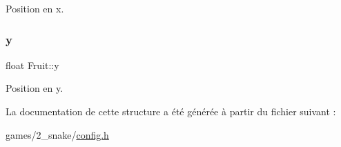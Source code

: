 Position en x. 

\mbox{\label{struct_fruit_a3a451bf39acece88739440190b1ccd98}} 
\subsubsection{\texorpdfstring{y}{y}}
{\footnotesize\ttfamily float Fruit\+::y}



Position en y. 



La documentation de cette structure a été générée à partir du fichier suivant \+:\begin{DoxyCompactItemize}
\item 
games/2\+\_\+snake/\hyperlink{2__snake_2config_8h}{config.\+h}\end{DoxyCompactItemize}
